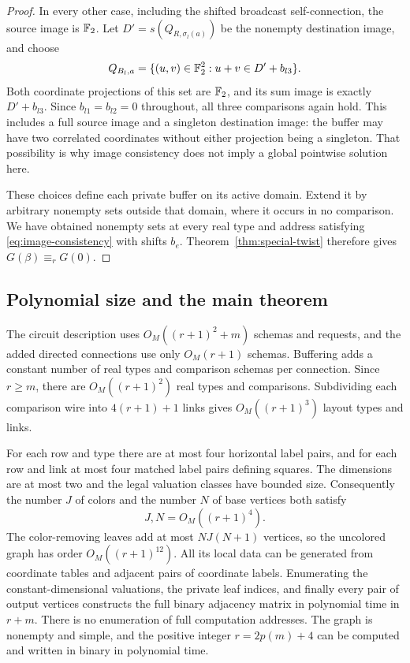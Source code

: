 \begin{proof}
In every other case, including the shifted broadcast self-connection, the
source image is \(\mathbb F_2\).  Let
\(D'=s(Q_{R,\sigma_l(a)})\) be the nonempty destination image, and choose
\begin{equation}
 Q_{B_l,a}=\{(u,v)\in\mathbb F_2^2:u+v\in D'+b_{l3}\}.
 \label{eq:rejecting-buffer-set}
\end{equation}
Both coordinate projections of this set are \(\mathbb F_2\), and its sum image is
exactly \(D'+b_{l3}\).  Since \(b_{l1}=b_{l2}=0\) throughout, all three
comparisons again hold.  This includes a full source image and a singleton
destination image: the buffer may have two correlated coordinates without
either projection being a singleton.  That possibility is why image
consistency does not imply a global pointwise solution here.

These choices define each private buffer on its active domain.  Extend it by
arbitrary nonempty sets outside that domain, where it occurs in no comparison.
We have obtained nonempty sets at every real type and address satisfying
\eqref{eq:image-consistency} with shifts \(b_e\).  Theorem~\ref{thm:special-twist}
therefore gives \(G(\beta)\equiv_r G(0)\).
\end{proof}

\subsection{Polynomial size and the main theorem}

The circuit description uses \(O_M((r+1)^2+m)\) schemas and requests, and
the added directed connections use only \(O_M(r+1)\) schemas.  Buffering
adds a constant number of real types and comparison schemas per connection.
Since \(r\ge m\), there are \(O_M((r+1)^2)\) real types and comparisons.
Subdividing each comparison wire into \(4(r+1)+1\) links gives
\(O_M((r+1)^3)\) layout types and links.

For each row and type there are at most four horizontal label pairs, and for
each row and link at most four matched label pairs defining squares.  The
dimensions are at most two and the legal valuation classes have bounded size.
Consequently the number \(J\) of colors and the number \(N\) of base vertices
both satisfy
\[
 J,N=O_M((r+1)^4).
\]
The color-removing leaves add at most \(NJ(N+1)\) vertices, so the uncolored
graph has order \(O_M((r+1)^{12})\).  All its local data can be generated
from coordinate tables and adjacent pairs of coordinate labels.  Enumerating
the constant-dimensional valuations, the private leaf indices, and finally
every pair of output vertices constructs the full binary adjacency matrix in
polynomial time in \(r+m\).  There is no enumeration of full computation
addresses.  The graph is nonempty and simple, and the positive integer
\(r=2p(m)+4\) can be computed and written in binary in polynomial time.

